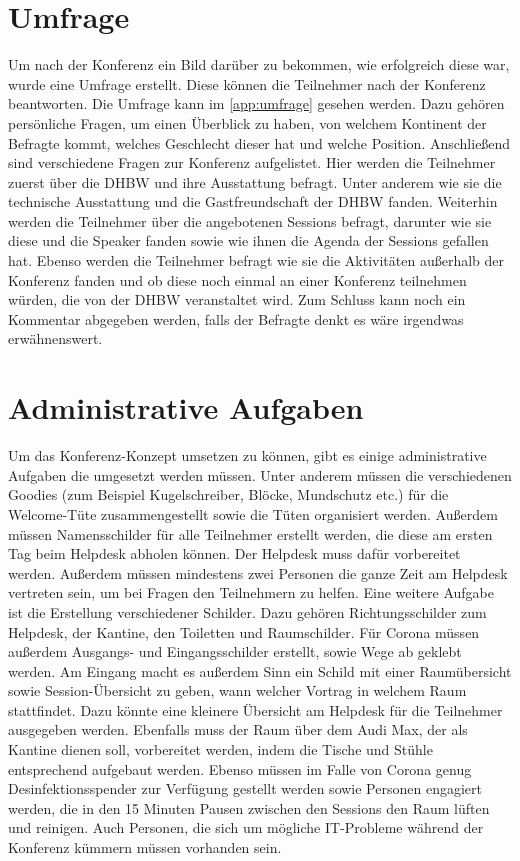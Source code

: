 \section{Umfrage}
Um nach der Konferenz ein Bild darüber zu bekommen, wie erfolgreich diese war, wurde eine Umfrage erstellt. Diese können die Teilnehmer nach der Konferenz beantworten. Die Umfrage kann im \autoref{app:umfrage} 
gesehen werden. Dazu gehören persönliche Fragen, um einen Überblick zu haben, von welchem Kontinent der Befragte kommt, welches Geschlecht dieser hat und welche Position. Anschließend sind verschiedene Fragen zur Konferenz aufgelistet. Hier werden die Teilnehmer zuerst über die DHBW und ihre Ausstattung befragt. Unter anderem wie sie die technische Ausstattung und die Gastfreundschaft der DHBW fanden. Weiterhin werden die Teilnehmer über die angebotenen Sessions befragt, darunter wie sie diese und die Speaker fanden sowie wie ihnen die Agenda der Sessions gefallen hat. Ebenso werden die Teilnehmer befragt wie sie die Aktivitäten außerhalb der Konferenz fanden und ob diese noch einmal an einer Konferenz teilnehmen würden, die von der DHBW veranstaltet wird. Zum Schluss kann noch ein Kommentar abgegeben werden, falls der Befragte denkt es wäre irgendwas erwähnenswert.  

\section{Administrative Aufgaben}
Um das Konferenz-Konzept umsetzen zu können, gibt es einige administrative Aufgaben die umgesetzt werden müssen. Unter anderem müssen die verschiedenen Goodies (zum Beispiel Kugelschreiber, Blöcke, Mundschutz etc.) für die Welcome-Tüte zusammengestellt sowie die Tüten organisiert werden. Außerdem müssen Namensschilder für alle Teilnehmer erstellt werden, die diese am ersten Tag beim Helpdesk abholen können. Der Helpdesk muss dafür vorbereitet werden. Außerdem müssen mindestens zwei Personen die ganze Zeit am Helpdesk vertreten sein, um bei Fragen den Teilnehmern zu helfen. Eine weitere Aufgabe ist die Erstellung verschiedener Schilder. Dazu gehören Richtungsschilder zum Helpdesk, der Kantine, den Toiletten und Raumschilder. Für Corona müssen außerdem Ausgangs- und Eingangsschilder erstellt, sowie Wege ab geklebt werden. Am Eingang macht es außerdem Sinn ein Schild mit einer Raumübersicht sowie Session-Übersicht zu geben, wann welcher Vortrag in welchem Raum stattfindet. Dazu könnte eine kleinere Übersicht am Helpdesk für die Teilnehmer ausgegeben werden. Ebenfalls muss der Raum über dem Audi Max, der als Kantine dienen soll, vorbereitet werden, indem die Tische und Stühle entsprechend aufgebaut werden. Ebenso müssen im Falle von Corona genug Desinfektionsspender zur Verfügung gestellt werden sowie Personen engagiert werden, die in den 15 Minuten Pausen zwischen den Sessions den Raum lüften und reinigen. Auch Personen, die sich um mögliche IT-Probleme während der Konferenz kümmern müssen vorhanden sein. 


